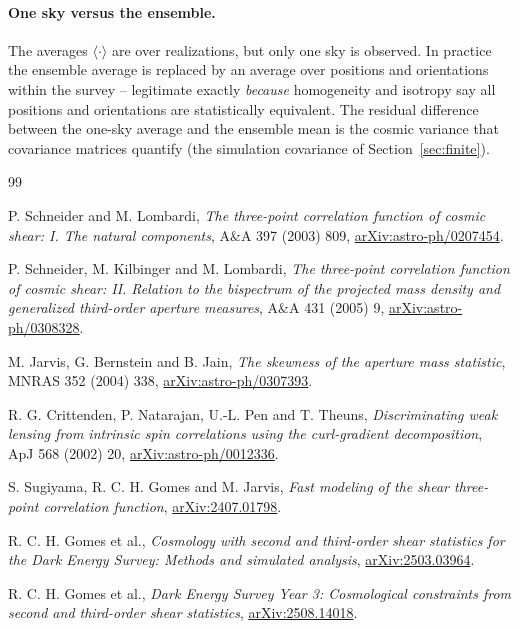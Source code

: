 \documentclass[11pt]{article}
\numberwithin{equation}{section}
\begin{document}
\paragraph{One sky versus the ensemble.}
The averages $\langle\cdot\rangle$ are over realizations, but only
one sky is observed.  In practice the ensemble average is replaced
by an average over positions and orientations within the survey --
legitimate exactly \emph{because} homogeneity and isotropy say all
positions and orientations are statistically equivalent.  The
residual difference between the one-sky average and the ensemble
mean is the cosmic variance that covariance matrices quantify (the
simulation covariance of Section~\ref{sec:finite}).
\begin{thebibliography}{99}

P. Schneider and M. Lombardi,
\emph{The three-point correlation function of cosmic shear: I. The
natural components},
A\&A 397 (2003) 809,
\href{https://arxiv.org/abs/astro-ph/0207454}{arXiv:astro-ph/0207454}.

P. Schneider, M. Kilbinger and M. Lombardi,
\emph{The three-point correlation function of cosmic shear: II.
Relation to the bispectrum of the projected mass density and
generalized third-order aperture measures},
A\&A 431 (2005) 9,
\href{https://arxiv.org/abs/astro-ph/0308328}{arXiv:astro-ph/0308328}.

M. Jarvis, G. Bernstein and B. Jain,
\emph{The skewness of the aperture mass statistic},
MNRAS 352 (2004) 338,
\href{https://arxiv.org/abs/astro-ph/0307393}{arXiv:astro-ph/0307393}.

R. G. Crittenden, P. Natarajan, U.-L. Pen and T. Theuns,
\emph{Discriminating weak lensing from intrinsic spin correlations
using the curl-gradient decomposition},
ApJ 568 (2002) 20,
\href{https://arxiv.org/abs/astro-ph/0012336}{arXiv:astro-ph/0012336}.

S. Sugiyama, R. C. H. Gomes and M. Jarvis,
\emph{Fast modeling of the shear three-point correlation function},
\href{https://arxiv.org/abs/2407.01798}{arXiv:2407.01798}.

R. C. H. Gomes et al.,
\emph{Cosmology with second and third-order shear statistics for the
Dark Energy Survey: Methods and simulated analysis},
\href{https://arxiv.org/abs/2503.03964}{arXiv:2503.03964}.

R. C. H. Gomes et al.,
\emph{Dark Energy Survey Year 3: Cosmological constraints from
second and third-order shear statistics},
\href{https://arxiv.org/abs/2508.14018}{arXiv:2508.14018}.


\end{thebibliography}
\end{document}
